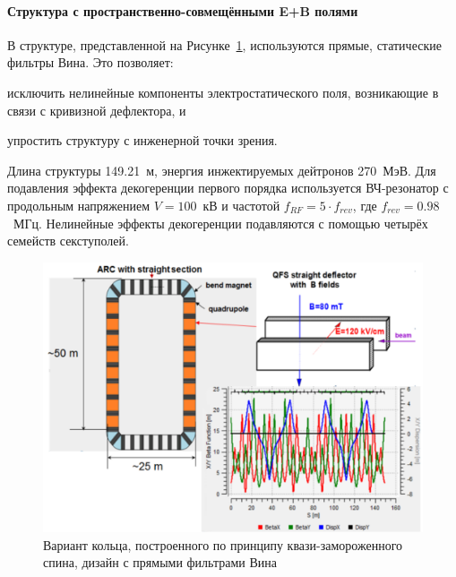 \paragraph{Структура с пространственно-совмещёнными E+B полями}\label{chpt2:lattice:QFS:EB}

В структуре, представленной на Рисунке~\ref{fig:QFS_E+B_lattice}, используются прямые, 
статические фильтры Вина. Это позволяет:
\begin{enumerate*}
	\item исключить нелинейные компоненты электростатического поля, 
	возникающие в связи с кривизной дефлектора, и 
	\item упростить структуру с инженерной точки зрения.
\end{enumerate*}

Длина структуры 149.21~м, энергия инжектируемых дейтронов 270~МэВ. 
Для подавления эффекта декогеренции первого порядка используется ВЧ-резонатор 
с продольным напряжением ${V = 100}$~кВ и частотой ${f_{RF} = 5\cdot f_{rev}}$, 
где ${f_{rev} = 0.98}$~МГц. Нелинейные эффекты декогеренции подавляются с помощью 
четырёх семейств секступолей.
\begin{figure}[H]
	\centering
	\includegraphics[width=\linewidth]{images/chapter2/E+B_lattice}
	\caption{Вариант кольца, построенного по принципу квази-замороженного спина, 
		дизайн с прямыми фильтрами Вина
	\label{fig:QFS_E+B_lattice}}
\end{figure}

